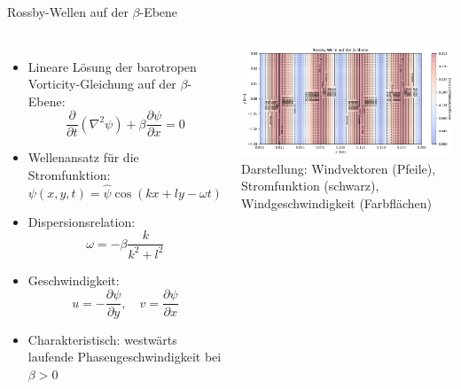   \begin{frame}{Rossby-Wellen auf der  $\beta$-Ebene}
    \begin{columns}
      \begin{itemize}
        \item Lineare Lösung der barotropen Vorticity-Gleichung auf der $\beta$-Ebene:
        \[
          \frac{\partial}{\partial t} \left( \nabla^2 \psi \right) + \beta \frac{\partial \psi}{\partial x} = 0
        \]
        \item Wellenansatz für die Stromfunktion:
        \[
          \psi(x, y, t) = \hat{\psi} \cos(kx + ly - \omega t)
        \]
        \item Dispersionsrelation:
        \[
          \omega = -\beta \frac{k}{k^2 + l^2}
        \]
        \item Geschwindigkeit:
        \[
          u = -\frac{\partial \psi}{\partial y}, \quad
          v = \frac{\partial \psi}{\partial x}
        \]
        \item Charakteristisch: westwärts laufende Phasengeschwindigkeit bei \( \beta > 0 \)
      \end{itemize}
  
      \centering
      \includegraphics[width=\linewidth]{../images/rossby_wave_beta.png}
      \scriptsize Darstellung: Windvektoren (Pfeile), Stromfunktion (schwarz), Windgeschwindigkeit (Farbflächen)
    \end{columns}
  \end{frame}
  
